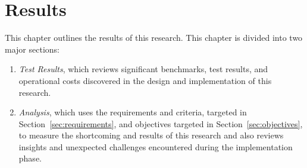 \chapter{Results}\label{chap:results}

This chapter outlines the results of this research.
%
%
This chapter is divided into two major sections:

\begin{enumerate}
  \item \emph{Test Results}, which reviews significant benchmarks, test results,
    and operational costs discovered in the design and implementation of this
    research.

  \item \emph{Analysis}, which uses the requirements and criteria, targeted in
    Section~\ref{sec:requirements}, and objectives targeted in
    Section~\ref{sec:objectives}, to measure the shortcoming and results of this
    research and also reviews insights and unexpected challenges encountered
    during the implementation phase.
\end{enumerate}


%
%
%
%
%




